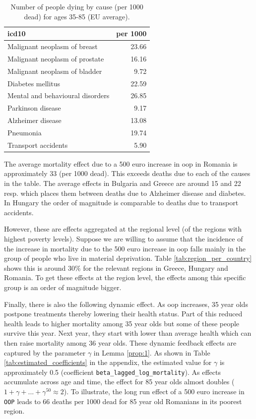 \documentclass[a4paper,12pt]{article}
\begin{document}
\begin{table}[htbp]
\caption{\label{tab:causes_death}Number of people dying by cause (per 1000 dead) for ages 35-85 (EU average).}
\centering
\begin{tabular}{lr}
icd10 & per 1000\\
\hline
Malignant neoplasm of breast & 23.66\\
Malignant neoplasm of prostate & 16.16\\
Malignant neoplasm of bladder & 9.72\\
Diabetes mellitus & 22.59\\
Mental and behavioural disorders & 26.85\\
Parkinson disease & 9.17\\
Alzheimer disease & 13.08\\
Pneumonia & 19.74\\
Transport accidents & 5.90\\
\end{tabular}
\end{table}

The average mortality effect due to a 500 euro increase in oop in Romania is approximately 33 (per 1000 dead). This exceeds deaths due to each of the causes in the table. The average effects in Bulgaria and Greece are around 15 and 22 resp. which places them between deaths due to Alzheimer disease and diabetes. In Hungary the order of magnitude is comparable to deaths due to transport accidents.

However, these are effects aggregated at the regional level (of the regions with highest poverty levels). Suppose we are willing to assume that the incidence of the increase in mortality due to the 500 euro increase in oop falls mainly in the group of people who live in material deprivation. Table \ref{tab:region_per_country} shows this is around 30\% for the relevant regions in Greece, Hungary and Romania. To get these effects at the region level, the effects among this specific group is an order of magnitude bigger.

Finally, there is also the following dynamic effect. As oop increases, 35 year olds postpone treatments thereby lowering their health status. Part of this reduced health leads to higher mortality among 35 year olds but some of these people survive this year. Next year, they start with lower than average health which can then raise mortality among 36 year olds. These dynamic feedback effects are captured by the parameter \(\gamma\) in Lemma \ref{prop:1}. As shown in Table \ref{tab:estimated_coefficients} in the appendix, the estimated value for \(\gamma\) is approximately 0.5 (coefficient \texttt{beta\_lagged\_log\_mortality}). As effects accumulate across age and time, the effect for 85 year olds almost doubles (\(1+\gamma+...+\gamma^{50} \approx 2\)). To illustrate, the long run effect of a 500 euro increase in \texttt{OOP} leads to 66 deaths per 1000 dead for 85 year old Romanians in its poorest region.
\end{document}
